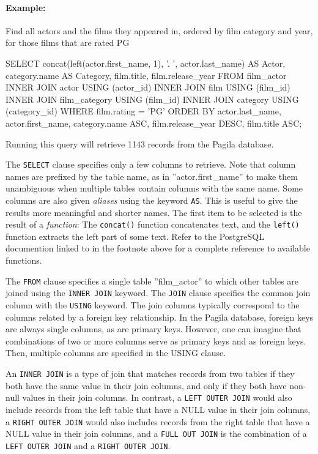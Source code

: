 \paragraph{Example:} Find all actors and the films they appeared in, ordered by film category and year, for those films that are rated PG

\begin{samepage}
\begin{sqlcode}
SELECT concat(left(actor.first_name, 1), '. ', 
           actor.last_name) AS Actor, 
       category.name AS Category, 
       film.title, 
       film.release_year
  FROM film_actor
  INNER JOIN actor USING (actor_id)
  INNER JOIN film USING (film_id)
  INNER JOIN film_category USING (film_id)
  INNER JOIN category USING (category_id)
  WHERE film.rating = 'PG'
  ORDER BY actor.last_name, 
           actor.first_name, 
           category.name ASC, 
           film.release_year DESC, 
           film.title ASC;
\end{sqlcode}
\end{samepage}

Running this query will retrieve 1143 records from the Pagila database. 

The \texttt{SELECT} clause specifies only a few columns to retrieve. Note that column names are prefixed by the table name, as in ''actor.first\_name'' to make them unambiguous when multiple tables contain columns with the same name. Some columns are also given \emph{aliases} using the keyword \texttt{AS}. This is useful to give the results more meaningful and shorter names. The first item to be selected is the result of a \emph{function}: The \texttt{concat()} function concatenates text, and the \texttt{left()} function extracts the left part of some text. Refer to the PostgreSQL documention linked to in the footnote above for a complete reference to available functions. 

The \texttt{FROM} clause specifies a single table ''film\_actor'' to which other tables are joined using the \texttt{INNER JOIN} keyword. The \texttt{JOIN} clause specifies the common join column with the \texttt{USING} keyword. The join columns typically correspond to the columns related by a foreign key relationship. In the Pagila database, foreign keys are always single columns, as are primary keys. However, one can imagine that combinations of two or more columns serve as primary keys and as foreign keys. Then, multiple columns are specified in the USING clause.

An \texttt{INNER JOIN} is a type of join that matches records from two tables if they both have the same value in their join columns, and only if they both have non-null values in their join columns. In contrast, a \texttt{LEFT OUTER JOIN} would also include records from the left table that have a NULL value in their join columns, a \texttt{RIGHT OUTER JOIN} would also includes records from the right table that have a NULL value in their join columns, and a \texttt{FULL OUT JOIN} is the combination of a \texttt{LEFT OUTER JOIN} and a \texttt{RIGHT OUTER JOIN}.

